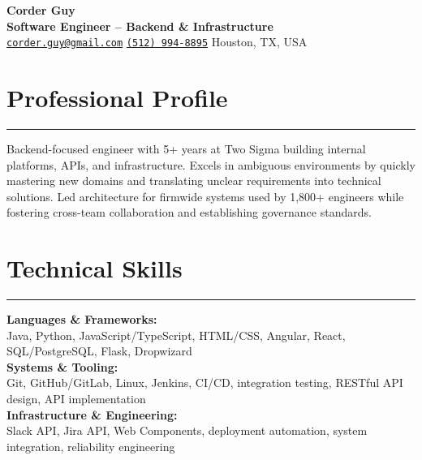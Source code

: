 \documentclass[10pt]{article}
\begin{document}
\begin{center}
  {\Huge\textbf{Corder Guy}} \\
  \vspace{0.7em}
  {\Large\textbf{Software Engineer -- Backend \& Infrastructure}} \\
  \href{mailto:corder.guy@gmail.com}{\texttt{corder.guy@gmail.com}}
  \textbar{}
  \href{tel:+15129948895}{\texttt{(512) 994-8895}}
  \textbar{}
  Houston, TX, USA
\end{center}

\newcommand{\sectionline}{\vspace{-0.75em}\hrule\vspace{0.5em}}
\newcommand{\resumesection}[1]{\section*{{\fontsize{17}{19}\selectfont #1}} \sectionline}

\resumesection{Professional Profile}
Backend-focused engineer with 5+ years at Two Sigma building internal platforms, APIs, and infrastructure. Excels in ambiguous environments by quickly mastering new domains and translating unclear requirements into technical solutions. Led architecture for firmwide systems used by 1,800+ engineers while fostering cross-team collaboration and establishing governance standards.

\newcommand{\skillsection}[2]{\textbf{#1:} \\ \hspace*{1em} #2}

\resumesection{Technical Skills}
\skillsection{Languages \& Frameworks}{}
Java, Python, JavaScript/TypeScript, HTML/CSS, Angular, React, SQL/PostgreSQL, Flask, Dropwizard \\
\skillsection{Systems \& Tooling}{}
Git, GitHub/GitLab, Linux, Jenkins, CI/CD, integration testing, RESTful API design, API implementation \\
\skillsection {Infrastructure \& Engineering}{}
Slack API, Jira API, Web Components, deployment automation, system integration, reliability engineering


\newcommand{\sectionentry}[2]{\textbf{#1} \hfill \emph{#2}}

\newcommand{\roleentry}[1]{\textbf{#1}}

\newenvironment{role}[1]{
  \roleentry{#1}
  \begin{itemize}[left=1.5em]
}{
  \end{itemize}
}
\end{document}
